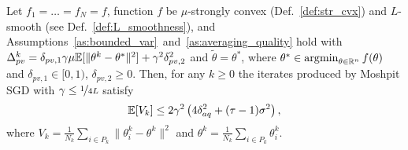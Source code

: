 \begin{lemma}\label{lem:V_k_lemma_cvx}
    Let $f_1 = \ldots = f_N = f$, function $f$ be $\mu$-strongly convex (Def.~\ref{def:str_cvx}) and $L$-smooth (see Def.~\ref{def:L_smoothness}), and Assumptions~\ref{as:bounded_var}~and~\ref{as:averaging_quality} hold with $\Delta_{pv}^k = \delta_{pv,1}\gamma\mu\mathbb{E}[\|\theta^k-\theta^*\|^2] + \gamma^2\delta_{pv,2}^2$ and $\widetilde{\theta} = \theta^*$, where $\theta^* \in \mathop{\arg\!\min}_{\theta\in\mathbb{R}^n} f(\theta)$ and $\delta_{pv,1}\in [0,1)$, $\delta_{pv,2}\ge 0$. Then, for any $k \ge 0$ the iterates produced by Moshpit SGD with $\gamma \le \nicefrac{1}{4L}$ satisfy
    \begin{equation}
        \mathbb{E}[V_k] \le 2\gamma^2\left(4\delta_{aq}^2 + (\tau-1)\sigma^2\right), \label{eq:V_k_bound_cvx}
    \end{equation}
    where $V_k = \frac{1}{N_k}\sum_{i\in P_k}\|\theta_i^k - \theta^k\|^2$ and $\theta^k = \frac{1}{N_k}\sum_{i\in P_k}\theta_i^k$.
\end{lemma}

